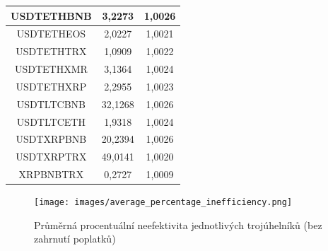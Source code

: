 \documentclass[thesis=B,czech]{FITthesis}[2019/03/21]
\begin{document}
\begin{table}
\begin{tabular}{|| c | c | c ||}
 \hline USDTETHBNB & 3,2273 & 1,0026\\ 
 \hline USDTETHEOS & 2,0227 & 1,0021\\ 
 \hline USDTETHTRX & 1,0909 & 1,0022\\ 
 \hline USDTETHXMR & 3,1364 & 1,0024\\ 
 \hline USDTETHXRP & 2,2955 & 1,0023\\ 
 \hline USDTLTCBNB & 32,1268 & 1,0026\\ 
 \hline USDTLTCETH & 1,9318 & 1,0024\\ 
 \hline USDTXRPBNB & 20,2394 & 1,0026\\ 
 \hline USDTXRPTRX & 49,0141 & 1,0020\\ 
 \hline XRPBNBTRX & 0,2727 & 1,0009\\ 
 \hline
\end{tabular}
\end{table}

\begin{figure}\centering
	\texttt{[image: images/average\_percentage\_inefficiency.png]}
	\caption{Průměrná procentuální neefektivita jednotlivých trojúhelníků (bez zahrnutí poplatků)}\label{average_percentage_inefficiency}
\end{figure}
\end{document}
